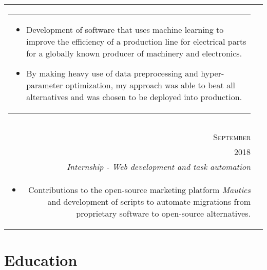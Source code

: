 \documentclass[a4paper,10pt]{article}
\begin{document}
\begin{tabularx}{\textwidth}{ r | X }
\begin{tabular}{p{}}
\begin{itemize}[leftmargin=*]
        \item Development of software that uses machine learning to improve the
            efficiency of a production line for electrical parts for a globally
            known producer of machinery and electronics.

        \item By making heavy use of data preprocessing and hyper-parameter
            optimization, my approach was able to beat all alternatives and was
            chosen to be deployed into production.

    \end{itemize}
    \end{tabular}
    \vspace{-6mm} \\
  \multicolumn{2}{c}{}\\

  \begin{tabular}{r}
      \textsc{August \&} \\
      \textsc{September} \\
      \textsc{2018}
  \end{tabular} &

  \begin{tabular}{p{}}
    \textsc{Padberg \& Partners} \\
    \emph{Internship - Web development and task automation}\\
    \vspace{-2mm}
    \begin{itemize}[leftmargin=*]

        \item Contributions to the open-source marketing platform
            \textit{Mautics} and development of scripts to automate migrations
            from proprietary software to open-source alternatives.

    \end{itemize}
  \end{tabular}
  \vspace{-6mm} \\

\end{tabularx}

\section{Education}
\end{document}
